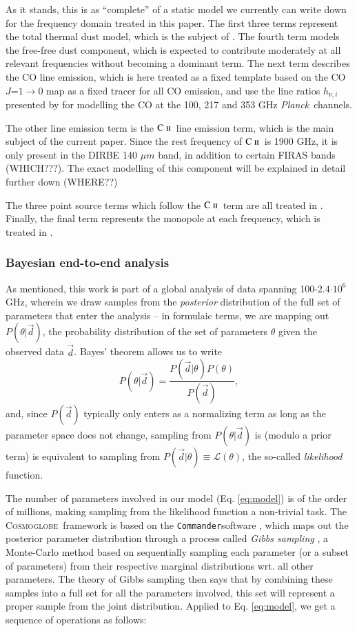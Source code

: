 \documentclass{aa}
\newcommand{\mathsc}[1]{{\normalfont\textsc{#1}}}
\def\Cosmoglobe{\textsc{Cosmoglobe}}
\def\Planck{\textit{Planck}}
\newcommand{\dv}[0]{\vec{d}}
\newcommand{\cii}{\ensuremath{\mathsc {C\ ii}}}
\def\commander{\texttt{Commander}}
\begin{document}
As it stands, this is as ``complete'' of a static model we currently can write down
for the frequency domain treated in this paper. The first three
terms represent the total thermal dust model, which is the subject of \citet{CG02_05}.
The fourth term models the free-free dust component, which is expected to
contribute moderately at all relevant frequencies without becoming a dominant
term. The next term describes the CO line emission, which is here treated as a
fixed template based on the \citet{dame:2001} CO $J$=$1\rightarrow 0$ map as a
fixed tracer for all CO emission, and use the line ratios $h_{\nu, i}$
presented by \citet{planck2014-a12} for modelling the CO at the 100, 217 and
353 GHz \Planck\ channels.

The other line emission term is the \cii\ line emission term, which is the main
subject of the current paper. Since the rest frequency of \cii\ is 1900 GHz, it
is only present in the DIRBE 140 $\mu m$ band, in addition to certain FIRAS
bands (WHICH???). The exact modelling of this component will be explained in
detail further down (WHERE??)

The three point source terms which follow the \cii\ term are all treated in
\citet{CG02_04}. Finally, the final term represents the monopole at each
frequency, which is treated in \citet{CG02_03}.

\subsubsection{Bayesian end-to-end analysis}
As mentioned, this work is part of a global analysis of data spanning
100-2.4$\cdot 10^6$ GHz, wherein we draw samples from the \emph{posterior}
distribution of the full set of parameters that enter the analysis
\citep{CG02_01} -- in formulaic terms, we are mapping out $P(\theta | \dv)$,
the probability distribution of the set of parameters $\theta$ given the
observed data $\dv$. Bayes' theorem allows us to write
\begin{equation}
    \label{eq:bayestheorem}
    P(\theta|\dv) = \frac{P(\dv|\theta)P(\theta)}{P(\dv)},
\end{equation}
and, since $P(\dv)$ typically only enters as a normalizing term as long as the
parameter space does not change, sampling from $P(\theta|\dv)$ is (modulo a
prior term) is equivalent to sampling from
$P(\dv|\theta)\equiv\mathcal{L}(\theta)$, the so-called \emph{likelihood}
function.

The number of parameters involved in our model (Eq. \ref{eq:model}) is of the
order of millions, making sampling from the likelihood function a non-trivial
task. The \Cosmoglobe\ framework is based on the \commander software
\citep{eriksen:2004,seljebotn:2019,bp03}, which maps out the posterior
parameter distribution through a process called \emph{Gibbs sampling}
\citep[e.g.,][]{geman:1984}, a Monte-Carlo method based on sequentially
sampling each parameter (or a subset of parameters) from their respective
marginal distributions wrt. all other parameters. The theory of Gibbs sampling
then says that by combining these samples into a full set for all the
parameters involved, this set will represent a proper sample from the joint
distribution. Applied to Eq. \ref{eq:model}, we get a sequence of operations as
follows:
\end{document}
